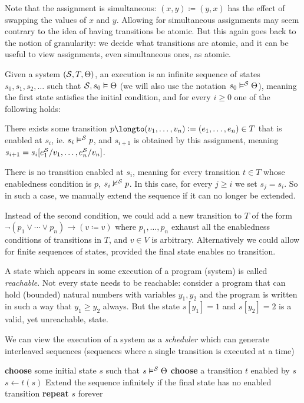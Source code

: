 Note that the assignment is simultaneous: $(x,y)\coloneqq(y,x)$ has the effect of swapping the values of $x$ and $y$.
Allowing for simultaneous assignments may seem contrary to the idea of having transitions be atomic.
But this again goes back to the notion of granularity: we decide what transitions are atomic, and it can be useful to view assignments, even simultaneous ones, as atomic.

\bdefn

    Given a system $({\cal S},T,\Theta)$, an {\emphcolor execution} is an infinite sequence of states $s_0,s_1,s_2,\dots$ such that ${\cal S},s_0\vDash\Theta$ (we will also use the notation
    $s_0\vDash^{\cal S}\Theta$), meaning the first state satisfies the initial condition, and for every $i\geq0$ one of the following holds:
    \benum
        \item There exists some transition $p\longto(v_1,\dots,v_n)\coloneqq(e_1,\dots,e_n)\in T$ that is enabled at $s_i$, ie. $s_i\vDash^{\cal S}p$, and $s_{i+1}$ is obtained by this assignment, meaning
        $s_{i+1}=s_i[e_1^{\cal S}/v_1,\dots,e_n^{\cal S}/v_n]$.
        \item There is no transition enabled at $s_i$, meaning for every transition $t\in T$ whose enabledness condition is $p$, $s_i\nvDash^{\cal S}p$.
            In this case, for every $j\geq i$ we set $s_j=s_i$.
            So in such a case, we manually extend the sequence if it can no longer be extended.
    \eenum

\edefn

Instead of the second condition, we could add a new transition to $T$ of the form $\neg(p_1\lor\cdots\lor p_n)\to(v\coloneqq v)$ where $p_1,\dots,p_n$ exhaust all the enabledness conditions of
transitions in $T$, and $v\in V$ is arbitrary.
Alternatively we could allow for finite sequences of states, provided the final state enables no transition.

A state which appears in some execution of a program (system) is called {\it reachable}.
Not every state needs to be reachable: consider a program that can hold (bounded) natural numbers with variables $y_1,y_2$ and the program is written in such a way that $y_1\geq y_2$ always.
But the state $s[y_1]=1$ and $s[y_2]=2$ is a valid, yet unreachable, state.

We can view the execution of a system as a {\it scheduler} which can generate interleaved sequences (sequences where a single transition is executed at a time)

\medskip
\algorithm
        \State\textbf{choose} some initial state $s$ such that $s\vDash^{\cal S}\Theta$
            \State\textbf{choose} a transition $t$ enabled by $s$
            \State $s\gets t(s)$
        \EndWhile
        \Comment Extend the sequence infinitely if the final state has no enabled transition\EndComment
        \State \textbf{repeat} $s$ forever
    \EndFunc
\ealgorithm
\medskip

